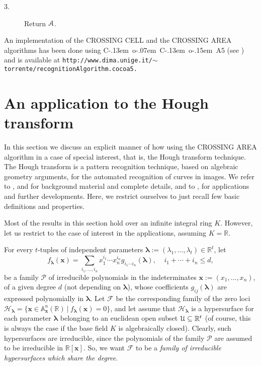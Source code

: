 \documentclass[10pt]{article}
\newcommand\sA{{\cal A}}
\newcommand\sU{{\cal U}}
\newcommand\reals{{\mathbb R}}
\newcommand{\x}{{\bm x}}
\newcommand\R{{\mathbb R}}
\def\cocoa{{\hbox{\rm C\kern-.13em o\kern-.07em C\kern-.13em o\kern-.15em A}}}
\begin{document}
{{{\begin{description}
\item[3.] Return $\sA$. 
\end{description}
}}

\medskip
An implementation of the  CROSSING CELL and the CROSSING AREA algorithms
has been done using \cocoa 5 (see \cite{Cocoa}) and is available at 
{\tt http://www.dima.unige.it/$\sim$torrente/recognitionAlgorithm.cocoa5.}




\section{An application to the  Hough transform}\label{RecAl}
\addtocounter{subsection}{1}\setcounter{theorem}{0}

In this section we discuss an explicit manner of how using 
the CROSSING AREA algorithm in a case of special interest, 
that is,  the Hough transform technique. The Hough transform is a pattern recognition technique,
based on algebraic geometry arguments, for the automated recognition of curves in images.
We refer to  \cite{DH},  \cite{BMP} and  \cite{BR}  for  background material and complete details, 
and to \cite{etal}, \cite{Ro} for applications and further developments. Here, we restrict ourselves 
to just recall few basic definitions and properties.

Most of the results in this section  hold over an infinite integral ring $K$. 
However, let us restrict to the case of interest in the applications, assuming $K= \reals$.

 
For every $t$-tuples of independent  parameters ${\bm \lambda}:=(\lambda_1,\ldots,\lambda_t)\in \R^t$, let 
\begin{equation}\label{GE} 
f_{\bm \lambda}({\x})=\sum_{i_1,\ldots,i_n} x_1^{i_1} \cdots  x_n^{i_n}g_{i_1\cdots i_n}({\bm \lambda}) , \;\;\;\; i_1+\cdots+i_n\leq d,
\end{equation}
be a family ${\mathcal P}$ of  irreducible polynomials in the indeterminates ${\x}:=(x_1,\ldots,x_n)$,  
of a given degree $d$ (not depending on ${\bm \lambda}$), whose coefficients $g_{ij}({\bm \lambda})$ 
are  expressed polynomially in ${\bm \lambda}$. Let $\mathcal{F}$ be the corresponding  family of the zero loci 
$\mathcal{H}_{\bm \lambda} = \{\x \in {\mathbb A}_{\x}^n(\R) \:|\: f_{\bm \lambda}(\x)=0\} $, 
and let assume that $\mathcal{H}_{\bm \lambda}$ is a hypersurface for each parameter ${\bm \lambda}$ belonging to an euclidean open subset $\sU\subseteq \R^t$
(of course, this is always  the  case  if  the base field $K$ is  algebraically closed). 
Clearly, such hypersurfaces are irreducible, since  the polynomials of the family ${\mathcal P}$ 
are assumed to be irreducible in $\R[{\x}]$. So, we want  $\mathcal{F}$ to be a  
{\em family of irreducible hypersurfaces which share the degree}.


}
\end{document}
